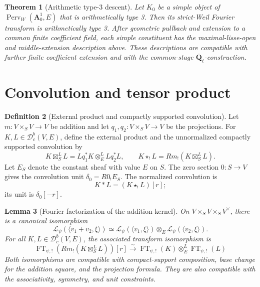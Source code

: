 \documentclass[10pt]{article}
\newtheorem{theorem}{Theorem}[section]
\newtheorem{lemma}[theorem]{Lemma}
\theoremstyle{definition}
\newtheorem{definition}[theorem]{Definition}
\newcommand{\Qlb}{\overline{\mathbf Q}_\ell}
\newcommand{\Aone}{\mathbf A^1}
\newcommand{\Dbc}{\mathcal D^b_c}
\newcommand{\FT}{\operatorname{FT}}
\newcommand{\Perv}{\operatorname{Perv}}
\begin{document}
\begin{theorem}[Arithmetic type-3 descent]
Let \(K_0\) be a simple object of \(\Perv_W(\Aone_0,E)\) that is
arithmetically type 3.  Then its strict-Weil Fourier transform is
arithmetically type 3.  After geometric pullback and extension to a common
finite coefficient field, each simple constituent has the maximal-lisse-open
and middle-extension description above.  These descriptions are compatible
with further finite coefficient extension and with the common-stage
\(\Qlb\)-construction.
\end{theorem}

\section{Convolution and tensor product}

\begin{definition}[External product and compactly supported convolution]
Let \(m:V\times_SV\to V\) be addition and let
\(q_1,q_2:V\times_SV\to V\) be the projections.  For
\(K,L\in\Dbc(V,E)\), define the external product and the unnormalized
compactly supported convolution by
\[
 K\boxtimes_S^LL=Lq_1^*K\otimes_E^LLq_2^*L,
 \qquad
 K\star_!L=Rm_!(K\boxtimes_S^LL).
\]
Let \(E_S\) denote the constant sheaf with value \(E\) on \(S\).  The zero
section \(0:S\to V\) gives the convolution unit
\(\delta_0=R0_!E_S\).  The normalized convolution is
\[
 K*L=(K\star_!L)[r];
\]
its unit is \(\delta_0[-r]\).
\end{definition}

\begin{lemma}[Fourier factorization of the addition kernel]
On \(V\times_SV\times_SV^\vee\), there is a canonical isomorphism
\[
 \mathcal L_\psi(\langle v_1+v_2,\xi\rangle)
 \simeq
 \mathcal L_\psi(\langle v_1,\xi\rangle)
 \otimes_E
 \mathcal L_\psi(\langle v_2,\xi\rangle).
\]
For all \(K,L\in\Dbc(V,E)\), the associated transform isomorphism is
\[
 \FT_{\psi,!}(Rm_!(K\boxtimes_S^LL))[r]
 \xrightarrow{\sim}
 \FT_{\psi,!}(K)\otimes_E^L\FT_{\psi,!}(L)
\]
Both isomorphisms are compatible with compact-support composition, base
change for the addition square, and the projection formula.  They are also
compatible with the associativity, symmetry, and unit constraints.
\end{lemma}
\end{document}
